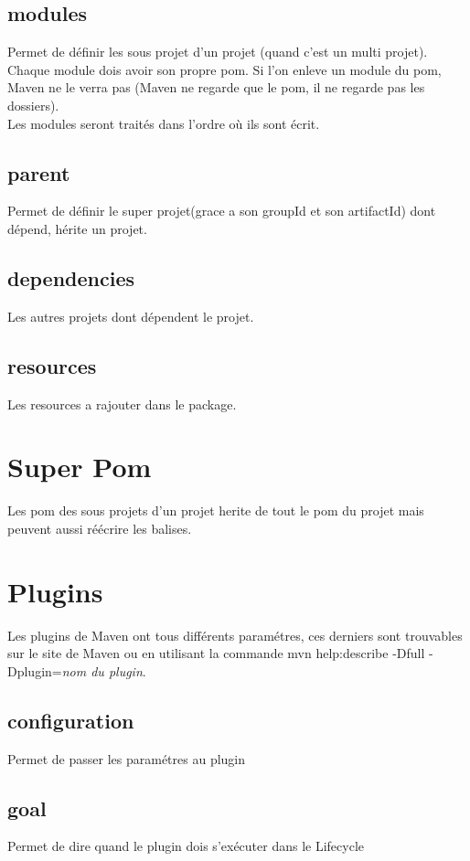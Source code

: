 \documentclass[a4paper,10pt]{article}
\begin{document}
\subsection{modules}
Permet de définir les sous projet d'un projet (quand c'est un multi projet). Chaque module dois avoir son propre pom. Si l'on enleve un module du pom, Maven ne le verra pas (Maven ne regarde que le pom, il ne regarde pas les dossiers).\\
Les modules seront traités dans l'ordre où ils sont écrit.

\subsection{parent}
Permet de définir le super projet(grace a son groupId et son artifactId) dont dépend, hérite un projet.

\subsection{dependencies}
Les autres projets dont dépendent le projet.

\subsection{resources}
Les resources a rajouter dans le package.


\section{Super Pom}
Les pom des sous projets d'un projet herite de tout le pom du projet mais peuvent aussi réécrire les balises.


\section{Plugins}
Les plugins de Maven ont tous différents paramétres, ces derniers sont trouvables sur le site de Maven ou en utilisant la commande mvn help:describe -Dfull -Dplugin=\textit{nom du plugin}.

\subsection{configuration}
Permet de passer les paramétres au plugin

\subsection{goal}
Permet de dire quand le plugin dois s'exécuter dans le Lifecycle
\end{document}

